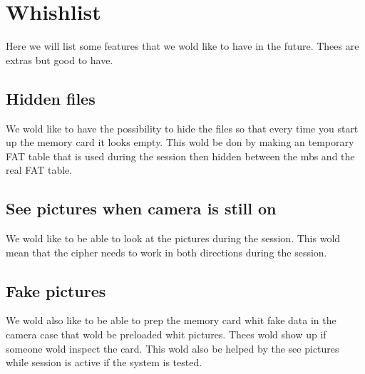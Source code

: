 \documentclass[]{article}
\begin{document}
\begin{table}[h]
	\centering
	\caption{This table shows the CID list}
	\label{table:cidList}
\end{table}

\clearpage

\section{Whishlist}
Here we will list some features that we wold like to have in the future.
Thees are extras but good to have.

\subsection{Hidden files}
We wold like to have the possibility to hide the files so that every time you start up the memory card it looks empty.
This wold be don by making an temporary FAT table that is used during the session then hidden between the \gls{mbs} and the real FAT table.

\subsection{See pictures when camera is still on}
We wold like to be able to look at the pictures during the session.
This wold mean that the cipher needs to work in both directions during the session.

\subsection{Fake pictures}
We wold also like to be able to prep the memory card whit fake data in the camera case that wold be preloaded whit pictures.
Thees wold show up if someone wold inspect the card.
This wold also be helped by the see pictures while session is active if the system is tested.




\clearpage
\newpage
\printglossary[type=\acronymtype]
\printnoidxglossaries


{}

\end{document}
